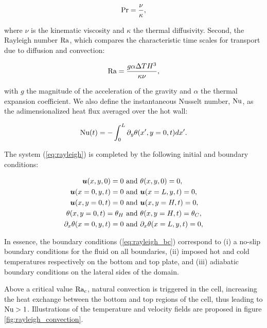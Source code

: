 \begin{equation*}
	\text{Pr} = \frac{\nu}{\kappa},
\end{equation*}

where $\nu$ is the kinematic viscosity and $\kappa$ the thermal diffusivity. Second, the Rayleigh number $\text{Ra}$, which compares the characteristic time scales for transport due to diffusion and convection:

\begin{equation*}
	\text{Ra} = \frac{g \alpha \Delta T H^3}{\kappa \nu},
\end{equation*}

with $g$ the magnitude of the acceleration of the gravity and $\alpha$ the thermal expansion coefficient. We also define the instantaneous Nusselt number, $\text{Nu}$, as the adimensionalized heat flux averaged over the hot wall:

\begin{equation}
\label{eq:nusselt}
	\text{Nu} (t) = - \int_{0}^{L} \partial_y \theta (x',y=0,t) dx'.
\end{equation}

The system (\ref{eq:rayleigh}) is completed by the following initial and boundary conditions:

\begin{equation}
\label{eq:rayleigh_bc}
\begin{split}
	\bm{u}(x,y,0)	= 0 &\text{ and } \theta(x,y,0)	= 0, \\
	\bm{u}(x=0,y,t)	= 0 &\text{ and } \bm{u}(x=L,y,t) = 0, \\
	\bm{u}(x,y=0,t)	= 0 &\text{ and } \bm{u}(x,y=H,t) = 0, \\
	\theta(x,y=0,t) 	= \theta_H &\text{ and } \theta(x,y=H,t) = \theta_C, \\
	\partial_x \theta(x=0,y,t) = 0 &\text{ and } \partial_x \theta(x=L,y,t) = 0,
\end{split}
\end{equation}

In essence, the boundary conditions (\ref{eq:rayleigh_bc}) correspond to (i) a no-slip boundary conditions for the fluid on all boundaries, (ii) imposed hot and cold temperatures respectively on the bottom and top plate, and (iii) adiabatic boundary conditions on the lateral sides of the domain.

%

Above a critical value $\text{Ra}_c$, natural convection is triggered in the cell, increasing the heat exchange between the bottom and top regions of the cell, thus leading to $\text{Nu} > 1$. Illustrations of the temperature and velocity fields are proposed in figure \ref{fig:rayleigh_convection}.

